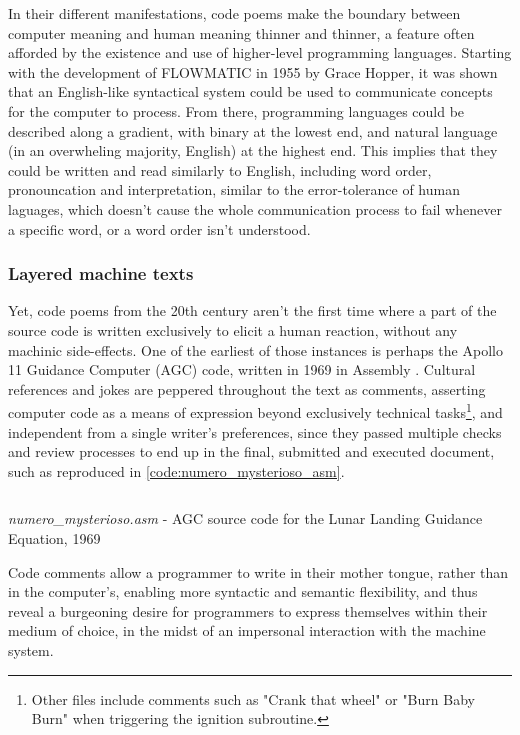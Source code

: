 In their different manifestations, code poems make the boundary between computer meaning and human meaning thinner and thinner, a feature often afforded by the existence and use of higher-level programming languages. Starting with the development of FLOWMATIC in 1955 by Grace Hopper, it was shown that an English-like syntactical system could be used to communicate concepts for the computer to process. From there, programming languages could be described along a gradient, with binary at the lowest end, and natural language (in an overwheling majority, English) at the highest end. This implies that they could be written and read similarly to English, including word order, pronouncation and interpretation, similar to the error-tolerance of human laguages, which doesn't cause the whole communication process to fail whenever a specific word, or a word order isn't understood.

\subsubsection{Layered machine texts}
\label{subsubsec:layered-machine-texts}

Yet, code poems from the 20th century aren't the first time where a part of the source code is written exclusively to elicit a human reaction, without any machinic side-effects. One of the earliest of those instances is perhaps the Apollo 11 Guidance Computer (AGC) code, written in 1969 in Assembly \citep{garry_lunar_landing_guidance_equations_1969}. Cultural references and jokes are peppered throughout the text as comments, asserting computer code as a means of expression beyond exclusively technical tasks\footnote{Other files include comments such as "Crank that wheel" or "Burn Baby Burn" when triggering the ignition subroutine.}, and independent from a single writer's preferences, since they passed multiple checks and review processes to end up in the final, submitted and executed document, such as reproduced in \autoref{code:numero_mysterioso_asm}.

\begin{listing}
  \inputminted{ca65}{./corpus/numero_mysterioso.asm}
  \caption{\emph{numero\_mysterioso.asm} - AGC source code for the Lunar Landing Guidance Equation, 1969}
  \label{code:numero_mysterioso_asm}
\end{listing}

Code comments allow a programmer to write in their mother tongue, rather than in the computer's, enabling more syntactic and semantic flexibility, and thus reveal a burgeoning desire for programmers to express themselves within their medium of choice, in the midst of an impersonal interaction with the machine system.


